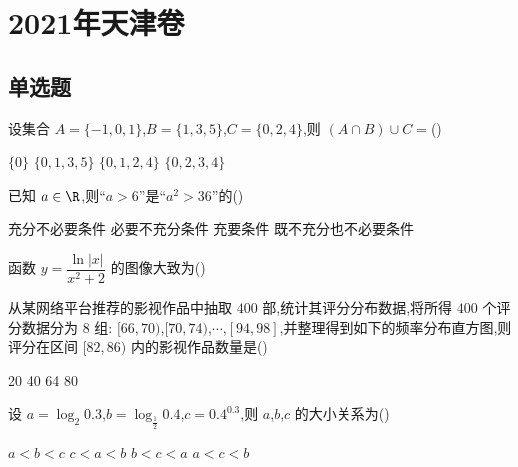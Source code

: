
\chapter{2021年天津卷}

\section{单选题}

\begin{problem}
设集合 \( A=\{-1,0,1\} \),\( B=\{1,3,5\} \),\( C=\{0,2,4\} \),则 \( \left( A\cap B \right)\cup C= \)(\quad)

\choices
    {\(\{0\}\)}
    {\(\{0,1,3,5\}\)}
    {\(\{0,1,2,4\}\)}
    {\(\{0,2,3,4\}\)}
\end{problem}

\begin{problem}
已知 \( a\in \R \),则``\( a>6 \)''是``\( a^2>36 \)''的(\quad)

\choices
    {充分不必要条件}
    {必要不充分条件}
    {充要条件}
    {既不充分也不必要条件}
\end{problem}

\begin{problem}
函数 \( y=\dfrac{\ln |x|}{x^2+2} \) 的图像大致为(\quad)

\choices
    {}
    {}
    {}
    {}
\end{problem}

\begin{problem}
从某网络平台推荐的影视作品中抽取 \( 400 \) 部,统计其评分分布数据,将所得 \( 400 \) 个评分数据分为 \( 8 \) 组:
\( [66,70) \),\( [70,74) \),\(\cdots\),\( [94,98] \),并整理得到如下的频率分布直方图,则评分在区间 \( [82,86) \) 内的影视作品数量是(\quad)


\choices
    {20}
    {40}
    {64}
    {80}
\end{problem}

\begin{problem}
设 \( a=\log_{2}0.3 \),\( b=\log_{\frac{1}{2}}0.4 \),\( c=0.4^{0.3} \),则 \(a\),\(b\),\(c\) 的大小关系为(\quad)

\choices
    {\(a<b<c\)}
    {\(c<a<b\)}
    {\(b<c<a\)}
    {\(a<c<b\)}
\end{problem}


